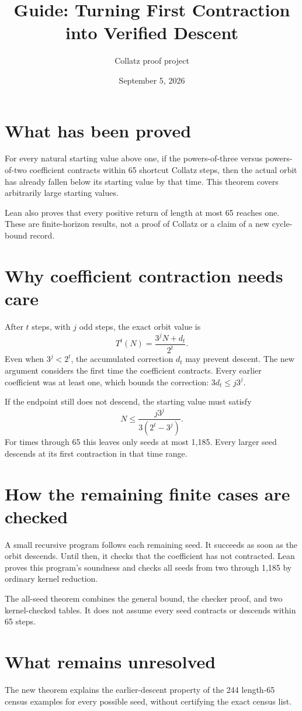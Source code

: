 \documentclass[10pt]{article}
\title{Guide: Turning First Contraction into Verified Descent}
\author{Collatz proof project}
\date{September 5, 2026}
\begin{document}
\maketitle
\section*{What has been proved}
For every natural starting value above one, if the powers-of-three versus
powers-of-two coefficient contracts within 65 shortcut Collatz steps,
then the actual orbit has already fallen below its starting value by that
time. This theorem covers arbitrarily large starting values.

Lean also proves that every positive return of length at most 65 reaches
one. These are finite-horizon results, not a proof of Collatz or a claim
of a new cycle-bound record.

\section*{Why coefficient contraction needs care}
After $t$ steps, with $j$ odd steps, the exact orbit value is
\[
T^t(N)=\frac{3^jN+d_t}{2^t}.
\]
Even when $3^j<2^t$, the accumulated correction $d_t$ may prevent descent.
The new argument considers the first time the coefficient contracts.
Every earlier coefficient was at least one, which bounds the correction:
$3d_t\le j3^j$.

If the endpoint still does not descend, the starting value must satisfy
\[
N\le\frac{j3^j}{3(2^t-3^j)}.
\]
For times through 65 this leaves only seeds at most 1,185. Every larger
seed descends at its first contraction in that time range.

\section*{How the remaining finite cases are checked}
A small recursive program follows each remaining seed. It succeeds as
soon as the orbit descends. Until then, it checks that the coefficient
has not contracted. Lean proves this program's soundness and checks all
seeds from two through 1,185 by ordinary kernel reduction.

The all-seed theorem combines the general bound, the checker proof, and
two kernel-checked tables. It does not assume every seed contracts or
descends within 65 steps.

\section*{What remains unresolved}
The new theorem explains the earlier-descent property of the 244
length-65 census examples for every possible seed, without certifying
the exact census list.
\end{document}
